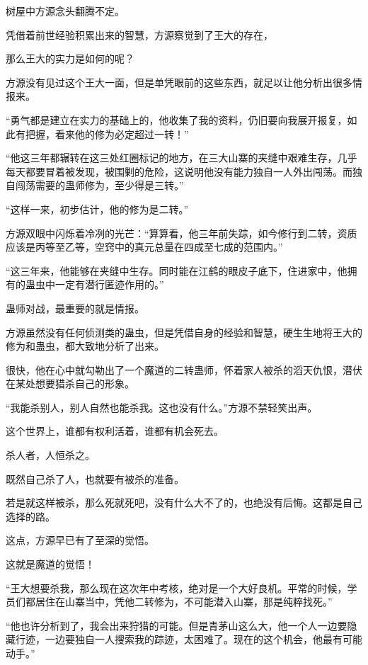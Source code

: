 
\begin{this_body}

树屋中方源念头翻腾不定。

凭借着前世经验积累出来的智慧，方源察觉到了王大的存在，

那么王大的实力是如何的呢？

方源没有见过这个王大一面，但是单凭眼前的这些东西，就足以让他分析出很多情报来。

“勇气都是建立在实力的基础上的，他收集了我的资料，仍旧要向我展开报复，如此有把握，看来他的修为必定超过一转！”

“他这三年都辗转在这三处红圈标记的地方，在三大山寨的夹缝中艰难生存，几乎每天都要冒着被发现，被围剿的危险，这说明他没有能力独自一人外出闯荡。而独自闯荡需要的蛊师修为，至少得是三转。”

“这样一来，初步估计，他的修为是二转。”

方源双眼中闪烁着冷冽的光芒：“算算看，他三年前失踪，如今修行到二转，资质应该是丙等至乙等，空窍中的真元总量在四成至七成的范围内。”

“这三年来，他能够在夹缝中生存。同时能在江鹤的眼皮子底下，住进家中，他拥有的蛊虫中一定有潜行匿迹作用的。”

蛊师对战，最重要的就是情报。

方源虽然没有任何侦测类的蛊虫，但是凭借自身的经验和智慧，硬生生地将王大的修为和蛊虫，都大致地分析了出来。

很快，他在心中就勾勒出了一个魔道的二转蛊师，怀着家人被杀的滔天仇恨，潜伏在某处想要猎杀自己的形象。

“我能杀别人，别人自然也能杀我。这也没有什么。”方源不禁轻笑出声。

这个世界上，谁都有权利活着，谁都有机会死去。

杀人者，人恒杀之。

既然自己杀了人，也就要有被杀的准备。

若是就这样被杀，那么死就死吧，没有什么大不了的，也绝没有后悔。这都是自己选择的路。

这点，方源早已有了至深的觉悟。

这就是魔道的觉悟！

“王大想要杀我，那么现在这次年中考核，绝对是一个大好良机。平常的时候，学员们都居住在山寨当中，凭他二转修为，不可能潜入山寨，那是纯粹找死。”

“他也许分析到了，我会出来狩猎的可能。但是青茅山这么大，他一个人一边要隐藏行迹，一边要独自一人搜索我的踪迹，太困难了。现在的这个机会，他最有可能动手。”


\end{this_body}
